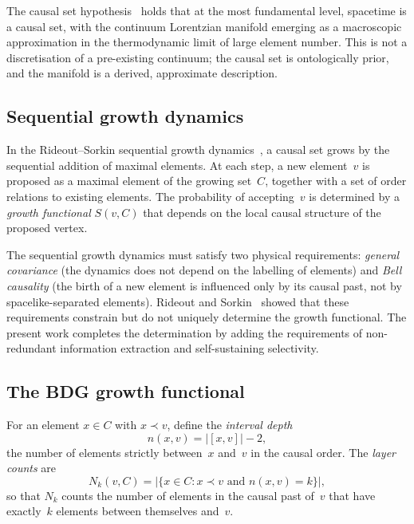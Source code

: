 \documentclass[12pt,a4paper]{article}
\begin{document}
The causal set hypothesis~\cite{Bombelli1987,Sorkin2005} holds that at the most fundamental level, spacetime is a causal set, with the continuum Lorentzian manifold emerging as a macroscopic approximation in the thermodynamic limit of large element number. This is not a discretisation of a pre-existing continuum; the causal set is ontologically prior, and the manifold is a derived, approximate description.

\subsection{Sequential growth dynamics}\label{sec:sequential_growth}

In the Rideout--Sorkin sequential growth dynamics~\cite{RideoutSorkin2000}, a causal set grows by the sequential addition of maximal elements. At each step, a new element~$v$ is proposed as a maximal element of the growing set~$C$, together with a set of order relations to existing elements. The probability of accepting~$v$ is determined by a \emph{growth functional} $S(v,C)$ that depends on the local causal structure of the proposed vertex.

The sequential growth dynamics must satisfy two physical requirements: \emph{general covariance} (the dynamics does not depend on the labelling of elements) and \emph{Bell causality} (the birth of a new element is influenced only by its causal past, not by spacelike-separated elements). Rideout and Sorkin~\cite{RideoutSorkin2000} showed that these requirements constrain but do not uniquely determine the growth functional. The present work completes the determination by adding the requirements of non-redundant information extraction and self-sustaining selectivity.

\subsection{The BDG growth functional}\label{sec:bdg_functional}

For an element $x \in C$ with $x \prec v$, define the \emph{interval depth}
\begin{equation}
n(x,v) = |[x,v]| - 2,
\label{eq:depth}
\end{equation}
the number of elements strictly between~$x$ and~$v$ in the causal order. The \emph{layer counts} are
\begin{equation}
N_k(v,C) = |\{x \in C : x \prec v \text{ and } n(x,v) = k\}|,
\label{eq:layer_counts}
\end{equation}
so that $N_k$ counts the number of elements in the causal past of~$v$ that have exactly~$k$ elements between themselves and~$v$.
\end{document}
